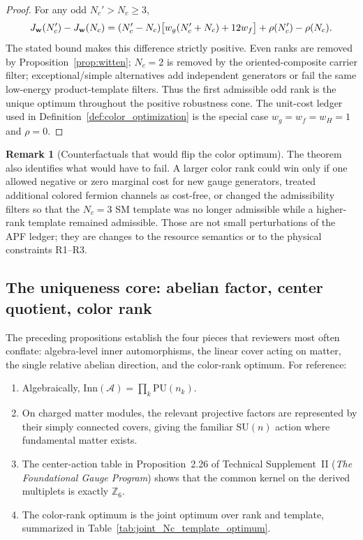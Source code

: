 \documentclass[11pt]{article}
\theoremstyle{definition}
\newtheorem{remark}[theorem]{Remark}
\newcommand{\SU}{\mathrm{SU}}
\newcommand{\TSII}{Technical Supplement~II (\emph{The Foundational Gauge Program})}
\begin{document}
\begin{proof}
For any odd $N_c'>N_c\ge3$,
\begin{equation}
  J_{\bf w}(N_c')-J_{\bf w}(N_c)
  =(N_c'-N_c)\bigl[w_g(N_c'+N_c)+12w_f\bigr]
  +\rho(N_c')-\rho(N_c).
\end{equation}
The stated bound makes this difference strictly positive.  Even ranks are
removed by Proposition~\ref{prop:witten}; $N_c=2$ is removed by the
oriented-composite carrier filter; exceptional/simple alternatives add
independent generators or fail the same low-energy product-template filters.
Thus the first admissible odd rank is the unique optimum throughout the
positive robustness cone.  The unit-cost ledger used in
Definition~\ref{def:color_optimization} is the special case
$w_g=w_f=w_H=1$ and $\rho=0$.
\end{proof}

\begin{remark}[Counterfactuals that would flip the color optimum]
The theorem also identifies what would have to fail.  A larger color rank
could win only if one allowed negative or zero marginal cost for new gauge
generators, treated additional colored fermion channels as cost-free, or
changed the admissibility filters so that the $N_c=3$ SM template was no
longer admissible while a higher-rank template remained admissible.  Those are
not small perturbations of the APF ledger; they are changes to the resource
semantics or to the physical constraints R1--R3.
\end{remark}

\subsection{The uniqueness core: abelian factor, center quotient, color rank}
\label{sec:uniqueness_core_v33}

The preceding propositions establish the four pieces that reviewers most
often conflate: algebra-level inner automorphisms, the linear cover acting
on matter, the single relative abelian direction, and the color-rank optimum.
For reference:
\begin{enumerate}[label=\textbf{U\arabic*},nosep]
  \item Algebraically, $\mathrm{Inn}(\mathcal A)=\prod_k\mathrm{PU}(n_k)$.
  \item On charged matter modules, the relevant projective factors are
  represented by their simply connected covers, giving the familiar
  $\SU(n)$ action where fundamental matter exists.
  \item The center-action table in Proposition~2.26 of \TSII{} shows
  that the common kernel on the derived multiplets is exactly $\mathbb Z_6$.
  \item The color-rank optimum is the joint optimum over rank and template,
  summarized in Table~\ref{tab:joint_Nc_template_optimum}.
\end{enumerate}
\end{document}
